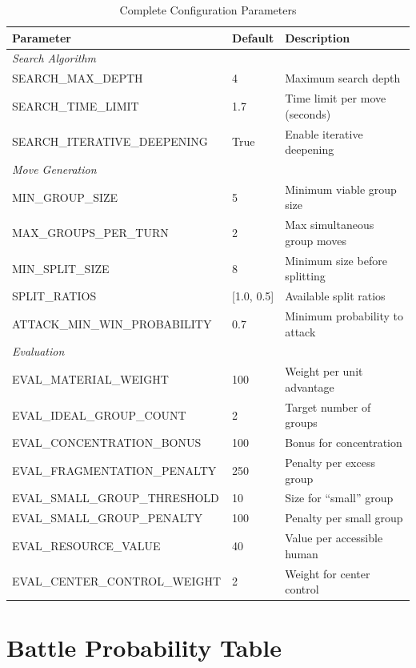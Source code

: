 \documentclass[11pt,a4paper]{article}
\begin{document}
\begin{table}[H]
\centering
\caption{Complete Configuration Parameters}
\small
\begin{tabular}{@{}llp{5cm}@{}}
\toprule
\textbf{Parameter} & \textbf{Default} & \textbf{Description} \\
\midrule
\multicolumn{3}{l}{\textit{Search Algorithm}} \\
SEARCH\_MAX\_DEPTH & 4 & Maximum search depth \\
SEARCH\_TIME\_LIMIT & 1.7 & Time limit per move (seconds) \\
SEARCH\_ITERATIVE\_DEEPENING & True & Enable iterative deepening \\
\midrule
\multicolumn{3}{l}{\textit{Move Generation}} \\
MIN\_GROUP\_SIZE & 5 & Minimum viable group size \\
MAX\_GROUPS\_PER\_TURN & 2 & Max simultaneous group moves \\
MIN\_SPLIT\_SIZE & 8 & Minimum size before splitting \\
SPLIT\_RATIOS & [1.0, 0.5] & Available split ratios \\
ATTACK\_MIN\_WIN\_PROBABILITY & 0.7 & Minimum probability to attack \\
\midrule
\multicolumn{3}{l}{\textit{Evaluation}} \\
EVAL\_MATERIAL\_WEIGHT & 100 & Weight per unit advantage \\
EVAL\_IDEAL\_GROUP\_COUNT & 2 & Target number of groups \\
EVAL\_CONCENTRATION\_BONUS & 100 & Bonus for concentration \\
EVAL\_FRAGMENTATION\_PENALTY & 250 & Penalty per excess group \\
EVAL\_SMALL\_GROUP\_THRESHOLD & 10 & Size for ``small'' group \\
EVAL\_SMALL\_GROUP\_PENALTY & 100 & Penalty per small group \\
EVAL\_RESOURCE\_VALUE & 40 & Value per accessible human \\
EVAL\_CENTER\_CONTROL\_WEIGHT & 2 & Weight for center control \\
\bottomrule
\end{tabular}
\end{table}

\section{Battle Probability Table}
\end{document}
